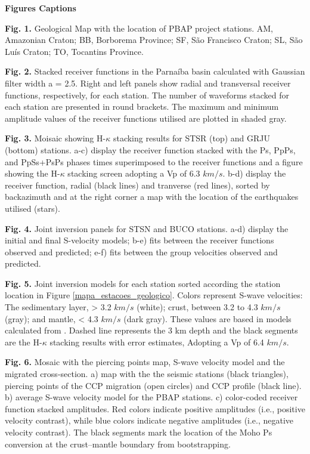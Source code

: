 \documentclass[paper,11pt]{geophysics}
\begin{document}
\pagebreak
\begin{flushleft}
\textbf{\LARGE Figures Captions}
\end{flushleft}

\textbf{Fig. 1.} Geological Map with the location of PBAP project stations. AM, Amazonian Craton; BB, Borborema Province; SF, São Francisco Craton; SL, São Luís Craton; TO, Tocantins Province.

\textbf{Fig. 2.} Stacked receiver functions in the Parnaíba basin calculated with Gaussian filter width a = 2.5. Right and left panels show radial and transversal receiver functions, respectively, for each station. The number of waveforms stacked for each station are presented in round brackets. The maximum and minimum amplitude values of the receiver functions utilised are plotted in shaded gray.


\textbf{Fig. 3.} Moisaic showing H-$\kappa$ stacking results for STSR (top) and GRJU (bottom) stations. a-c) display the receiver function stacked with the Ps, PpPs, and PpSs+PsPs phases times superimposed to the receiver functions and a figure showing the H-$\kappa$ stacking screen adopting a Vp of 6.3 $km/s$. b-d) display the receiver function, radial (black lines) and tranverse (red lines), sorted by backazimuth and at the right corner a map with the location of the earthquakes utilised (stars).

\textbf{Fig. 4.} Joint inversion panels for STSN and BUCO stations. a-d) display the initial and final S-velocity models; b-e) fits between the receiver
functions observed and predicted; e-f) fits between the group velocities observed and predicted.

\textbf{Fig. 5.} Joint inversion models for each station sorted according the station location in Figure \ref{mapa_estacoes_geologico}. Colors represent S-wave velocities: The sedimentary layer, > 3.2 $km/s$ (white); crust, between 3.2 to 4.3 $km/s$ (gray); and mantle, < 4.3 $km/s$ (dark gray). These values are based in models calculated from \cite{mooney_crust_1998}. Dashed line represents the 3 km depth and the black segments are the H-$\kappa$ stacking results with error estimates, Adopting a Vp of 6.4 $km/s$.


\textbf{Fig. 6.} Mosaic with the piercing points map, S-wave velocity model and the migrated cross-section. a) map with the the seismic stations (black triangles), piercing points of the CCP migration (open circles) and CCP profile (black line). b) average S-wave velocity model for the PBAP stations. c) color-coded receiver function stacked amplitudes. Red colors indicate positive amplitudes (i.e., positive velocity contrast), while blue colors indicate negative amplitudes (i.e., negative velocity contrast). The black segments mark the location of the Moho Ps conversion at the crust–mantle boundary from bootstrapping.
    
\end{document}
